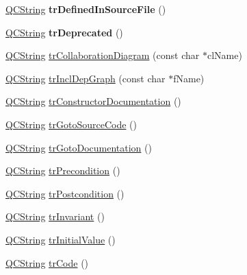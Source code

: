 \begin{DoxyCompactItemize}
\item 
\mbox{\label{class_translator_croatian_a7b9f8de8d63cc6230c841d4e20ae7175}} 
\mbox{\hyperlink{class_q_c_string}{Q\+C\+String}} {\bfseries tr\+Defined\+In\+Source\+File} ()
\item 
\mbox{\label{class_translator_croatian_ada45df7ee2039cd348645aeb59994378}} 
\mbox{\hyperlink{class_q_c_string}{Q\+C\+String}} {\bfseries tr\+Deprecated} ()
\item 
\mbox{\hyperlink{class_q_c_string}{Q\+C\+String}} \mbox{\hyperlink{class_translator_croatian_a219aae35a34f8cbb2360f975b587e15f}{tr\+Collaboration\+Diagram}} (const char $\ast$cl\+Name)
\item 
\mbox{\hyperlink{class_q_c_string}{Q\+C\+String}} \mbox{\hyperlink{class_translator_croatian_adbf1e568674c1ac0c714d666a3850a6c}{tr\+Incl\+Dep\+Graph}} (const char $\ast$f\+Name)
\item 
\mbox{\hyperlink{class_q_c_string}{Q\+C\+String}} \mbox{\hyperlink{class_translator_croatian_a8dc880bee93a7c83e25afe263c61e3ec}{tr\+Constructor\+Documentation}} ()
\item 
\mbox{\hyperlink{class_q_c_string}{Q\+C\+String}} \mbox{\hyperlink{class_translator_croatian_ac2325fb02e0c05ec60f29aa20f03f92f}{tr\+Goto\+Source\+Code}} ()
\item 
\mbox{\hyperlink{class_q_c_string}{Q\+C\+String}} \mbox{\hyperlink{class_translator_croatian_aabde4bac34e98b47a4eb3536d6eda47a}{tr\+Goto\+Documentation}} ()
\item 
\mbox{\hyperlink{class_q_c_string}{Q\+C\+String}} \mbox{\hyperlink{class_translator_croatian_ad2097218c31987550d49fc15ea24105a}{tr\+Precondition}} ()
\item 
\mbox{\hyperlink{class_q_c_string}{Q\+C\+String}} \mbox{\hyperlink{class_translator_croatian_a96f1eb4be405b042e408112bf8d84dfc}{tr\+Postcondition}} ()
\item 
\mbox{\hyperlink{class_q_c_string}{Q\+C\+String}} \mbox{\hyperlink{class_translator_croatian_a44c8817e5ab5c325e5d5fad24bacf312}{tr\+Invariant}} ()
\item 
\mbox{\hyperlink{class_q_c_string}{Q\+C\+String}} \mbox{\hyperlink{class_translator_croatian_a6a8d2d0c029a69806569389ea76e9413}{tr\+Initial\+Value}} ()
\item 
\mbox{\hyperlink{class_q_c_string}{Q\+C\+String}} \mbox{\hyperlink{class_translator_croatian_a0b048408f4559f797aff870fdd4f988f}{tr\+Code}} ()

\end{DoxyCompactItemize}
